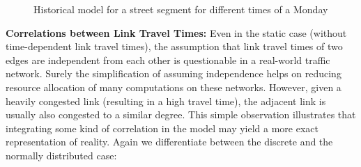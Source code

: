 \begin{figure}
    \centering
    \caption{Historical model for a street segment for different times of a
    Monday}\label{fig:ltt}
\end{figure}

\textbf{Correlations between Link Travel Times: } Even in the static case
(without time-dependent link travel times), the assumption that link travel times of two edges are independent from
each other is questionable in a real-world traffic network. Surely the
simplification of assuming independence helps on reducing resource allocation of many computations on these
networks. However, given a heavily congested link (resulting in a high
travel time), the adjacent link is usually also congested to a similar degree.
This simple observation illustrates that integrating some kind of correlation in
the model may yield a more exact representation of reality. Again we differentiate between the
discrete and the normally distributed case:

